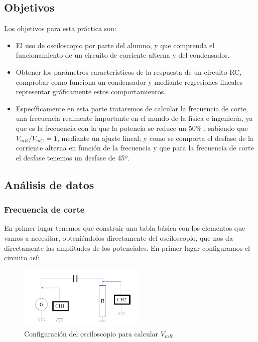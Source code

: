 \documentclass[10pt,a4paper]{article}
\begin{document}
\subsection{Objetivos}
Los objetivos para esta práctica son:
\begin{itemize}
\item El uso de osciloscopio por parte del alumno, y que comprenda el funcionamiento de un circuito de corriente alterna y del condensador.
\item Obtener los parámetros característicos de la respuesta de un circuito RC, comprobar como funciona un condensador y mediante regresiones lineales representar gráficamente estos comportamientos. 
\item Específicamente en esta parte trataremos de calcular la frecuencia de corte, una frecuencia realmente importante en el mundo de la física e ingeniería, ya que es la frecuencia con la que la potencia se reduce un 50\% , sabiendo que $V_{mR} / V_{mC} = 1$, mediante un ajuste lineal; y como se comporta el desfase de la corriente alterna en función de la frecuencia y que para la frecuencia de corte el desfase tenemos un desfase de 45º.
\end{itemize}


\subsection{Análisis de datos }
\subsubsection{Frecuencia de corte}
En primer lugar tenemos que construir una tabla básica con los elementos que vamos a necesitar, obteniéndolos directamente del osciloscopio, que nos da directamente las amplitudes de los potenciales. En primer lugar configuramos el circuito así:


\begin{figure}[htb] %
\centering
\includegraphics[width=6cm, height=3cm]{Osciloscopio 1}
\caption{Configuración del osciloscopio para calcular $V_{mR}$ }
\label{fig: Osciloscopio 1}
\end{figure}
\end{document}
